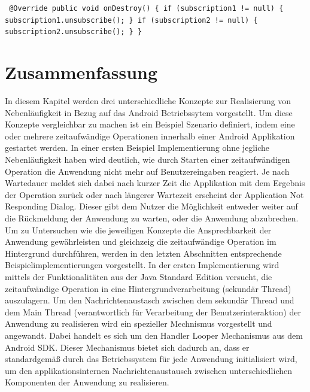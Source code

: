 \documentclass[12pt,oneside,a4paper,bibtotoc,liststotoc]{scrreprt}
\begin{document}
\texttt{\newline
@Override\newline
   public void onDestroy() \{\newline
       if (subscription1 != null) \{\newline
           subscription1.unsubscribe();\newline
       \}\newline
       if (subscription2 != null) \{\newline
           subscription2.unsubscribe();\newline
       \}\newline
   \}\newline
}

\section{Zusammenfassung}
In diesem Kapitel werden drei unterschiedliche Konzepte zur Realisierung von Nebenläufigkeit in Bezug auf das Android Betriebssytem vorgestellt. Um diese Konzepte vergleichbar zu machen ist ein Beispiel Szenario definiert, indem eine oder mehrere zeitaufwändige Operationen innerhalb einer Android Applikation gestartet werden. In einer ersten Beispiel Implementierung ohne jegliche Nebenläufigkeit haben wird deutlich, wie durch Starten einer zeitaufwändigen Operation die Anwendung nicht mehr auf Benutzereingaben reagiert. Je nach Wartedauer meldet sich dabei nach kurzer Zeit die Applikation mit dem Ergebnis der Operation zurück oder nach längerer Wartezeit erscheint der Application Not Responding Dialog. Dieser gibt dem Nutzer die Möglichkeit entweder weiter auf die Rückmeldung der Anwendung zu warten, oder die Anwendung abzubrechen. Um zu Untersuchen wie die jeweiligen Konzepte die Ansprechbarkeit der Anwendung gewährleisten und gleichzeig die zeitaufwändige Operation im Hintergrund durchführen, werden in den letzten Abschnitten entsprechende Beispielimplementierungen  vorgestellt.\newline
In der ersten Implementierung wird mittels der Funktionalitäten aus der Java Standard Edition versucht, die zeitaufwändige Operation in eine Hintergrundverarbeitung (sekundär Thread) auszulagern. Um den Nachrichtenaustasch zwischen dem sekundär Thread und dem Main Thread (verantwortlich für Verarbeitung der Benutzerinteraktion) der Anwendung zu realisieren wird ein spezieller Mechnismus vorgestellt und angewandt. Dabei handelt es sich um den Handler Looper Mechanismus aus dem Android SDK. Dieser Mechanismus bietet sich dadurch an, dass er standardgemäß durch das Betriebssystem für jede Anwendung initialisiert wird, um den applikationsinternen Nachrichtenaustausch zwischen unterschiedlichen Komponenten der Anwendung zu realisieren.\newline
\end{document}
